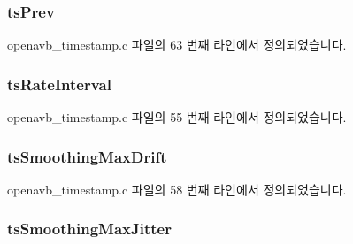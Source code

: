 \subsubsection[{\texorpdfstring{ts\+Prev}{tsPrev}}]{ ts\+Prev}\hypertarget{structopenavb__timestamp__eval_a752227879133fdcf6b043c499df0933e}{}\label{structopenavb__timestamp__eval_a752227879133fdcf6b043c499df0933e}


openavb\+\_\+timestamp.\+c 파일의 63 번째 라인에서 정의되었습니다.

\subsubsection[{\texorpdfstring{ts\+Rate\+Interval}{tsRateInterval}}]{ ts\+Rate\+Interval}\hypertarget{structopenavb__timestamp__eval_aca7cc664761bfb852738c9b42f6531c3}{}\label{structopenavb__timestamp__eval_aca7cc664761bfb852738c9b42f6531c3}


openavb\+\_\+timestamp.\+c 파일의 55 번째 라인에서 정의되었습니다.

\subsubsection[{\texorpdfstring{ts\+Smoothing\+Max\+Drift}{tsSmoothingMaxDrift}}]{ ts\+Smoothing\+Max\+Drift}\hypertarget{structopenavb__timestamp__eval_a2c8aab27c25388322a65a4951b0806bc}{}\label{structopenavb__timestamp__eval_a2c8aab27c25388322a65a4951b0806bc}


openavb\+\_\+timestamp.\+c 파일의 58 번째 라인에서 정의되었습니다.

\subsubsection[{\texorpdfstring{ts\+Smoothing\+Max\+Jitter}{tsSmoothingMaxJitter}}]{ ts\+Smoothing\+Max\+Jitter}\hypertarget{structopenavb__timestamp__eval_af356bc9e1ac1479501ce4169c3f8254c}{}\label{structopenavb__timestamp__eval_af356bc9e1ac1479501ce4169c3f8254c}



